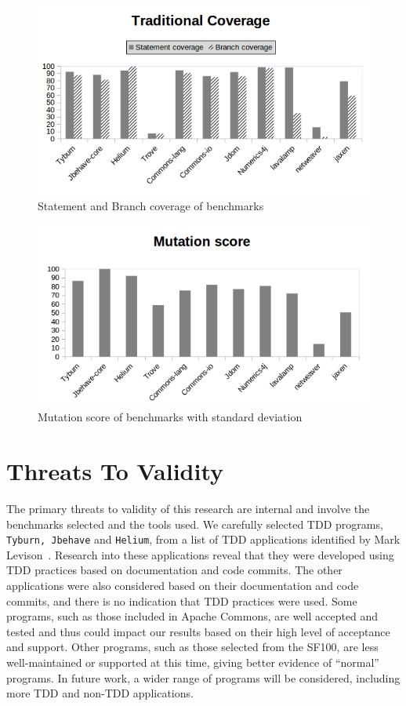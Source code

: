 \documentclass[conference]{IEEEtran}
\begin{document}
 \begin{figure}[t!]
\centering
\includegraphics[scale=.4]{benchmark_coverage.png}
\caption{Statement and Branch coverage of benchmarks}
\label{fig:coverage}
\end{figure}
\begin{figure}[t!]
\centering
\includegraphics[scale=.4]{benchmark_mutation.png}
\caption{Mutation score of benchmarks with standard deviation}
\label{fig:mutations}
\end{figure}

\section{Threats To Validity}
The primary threats to validity of this research are internal and involve the benchmarks selected and the tools used.  We carefully selected TDD programs, \texttt{Tyburn, Jbehave} and \texttt{Helium}, from a list of TDD applications identified by Mark Levison~\cite{mlevinson:2008}.  Research into these applications reveal that they were developed using TDD practices based on documentation and code commits.  The other applications were also considered based on their documentation and code commits, and there is no indication that TDD practices were used.  Some programs, such as those included in Apache Commons, are well accepted and tested and thus could impact our results based on their high level of acceptance and support.  Other programs, such as those selected from the SF100, are less well-maintained or supported at this time, giving better evidence of ``normal'' programs.  In future work, a wider range of programs will be considered, including more TDD and non-TDD applications.
\end{document}

